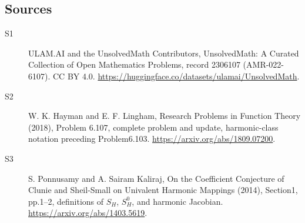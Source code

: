 \documentclass[11pt]{article}
\begin{document}
\subsection{Sources}
\begin{description}
\item[\hypertarget{source:2306107:1}{S1}] ULAM.AI and the UnsolvedMath Contributors, UnsolvedMath: A Curated Collection of Open Mathematics Problems, record 2306107 (AMR-022-6107). CC BY 4.0. \url{https://huggingface.co/datasets/ulamai/UnsolvedMath}.
\item[\hypertarget{source:2306107:2}{S2}] W. K. Hayman and E. F. Lingham, Research Problems in Function Theory (2018), Problem 6.107, complete problem and update, harmonic-class notation preceding Problem6.103. \url{https://arxiv.org/abs/1809.07200}.
\item[\hypertarget{source:2306107:3}{S3}] S. Ponnusamy and A. Sairam Kaliraj, On the Coefficient Conjecture of Clunie and Sheil-Small on Univalent Harmonic Mappings (2014), Section1, pp.1--2, definitions of $S_H$, $S_H^0$, and harmonic Jacobian. \url{https://arxiv.org/abs/1403.5619}.
\end{description}
\label{end:2306107}
\end{document}
